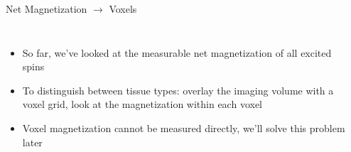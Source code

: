 \begin{frame}{Net Magnetization $\rightarrow$ Voxels}

    \begin{columns}
        \begin{itemize}
            \item So far, we've looked at the measurable net magnetization of all excited spins
            \item To distinguish between tissue types: overlay the imaging volume with a voxel grid, look at the magnetization within each voxel
            \item Voxel magnetization cannot be measured directly, we'll solve this problem later
        \end{itemize}

        \begin{center}
\end{center}
\end{columns}
\end{frame}
